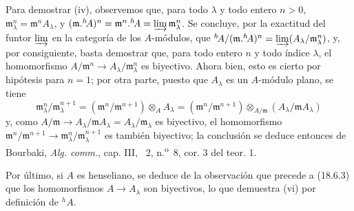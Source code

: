 Para demostrar (iv), observemos que, para todo $\lambda$ y todo entero $n>0$, $\mathfrak m_\lambda^n=\mathfrak m^nA_\lambda$, y
$(\mathfrak m.{}^h\!A)^n=\mathfrak m^n.{}^h\!A=\varinjlim\mathfrak m_\lambda^n$.
Se concluye, por la exactitud del funtor $\varinjlim$ en la categoría de los $A$-módulos, que
${}^h\!A/(\mathfrak m.{}^h\!A)^n=\varinjlim(A_\lambda/\mathfrak m_\lambda^n)$,
y, por consiguiente, basta demostrar que, para todo entero $n$ y todo índice $\lambda$, el homomorfismo $A/\mathfrak m^n\to A_\lambda/\mathfrak m_\lambda^n$ es biyectivo. Ahora bien, esto es cierto por hipótesis para $n=1$; por otra parte, puesto que $A_\lambda$ es un $A$-módulo plano, se tiene
\[
  \mathfrak m_\lambda^n/\mathfrak m_\lambda^{n+1}
  =(\mathfrak m^n/\mathfrak m^{n+1})\otimes_A A_\lambda
  =(\mathfrak m^n/\mathfrak m^{n+1})\otimes_{A/\mathfrak m}(A_\lambda/\mathfrak mA_\lambda)
\]
y, como $A/\mathfrak m\to A_\lambda/\mathfrak mA_\lambda=A_\lambda/\mathfrak m_\lambda$ es biyectivo, el homomorfismo $\mathfrak m^n/\mathfrak m^{n+1}\to\mathfrak m_\lambda^n/\mathfrak m_\lambda^{n+1}$ es también biyectivo; la conclusión se deduce entonces de Bourbaki, \emph{Alg. comm.}, cap. III, \textsection~2, n.\textsuperscript{o}~8, cor. 3 del teor. 1.

Por último, si $A$ es henseliano, se deduce de la observación que precede a (18.6.3) que los homomorfismos $A\to A_\lambda$ son biyectivos, lo que demuestra (vi) por definición de ${}^h\!A$.

